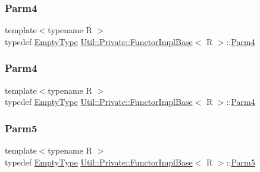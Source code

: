 \mbox{\label{structUtil_1_1Private_1_1FunctorImplBase_a1ad7fe3f243480c44a610927ebe76762}} 
\subsubsection{\texorpdfstring{Parm4}{Parm4}\hspace{0.1cm}{\footnotesize\ttfamily [2/3]}}
{\footnotesize\ttfamily template$<$typename R $>$ \\
typedef \mbox{\hyperlink{classUtil_1_1EmptyType}{Empty\+Type}} \mbox{\hyperlink{structUtil_1_1Private_1_1FunctorImplBase}{Util\+::\+Private\+::\+Functor\+Impl\+Base}}$<$ R $>$\+::\mbox{\hyperlink{structUtil_1_1Private_1_1FunctorImplBase_a1ad7fe3f243480c44a610927ebe76762}{Parm4}}}

\mbox{\label{structUtil_1_1Private_1_1FunctorImplBase_a1ad7fe3f243480c44a610927ebe76762}} 
\subsubsection{\texorpdfstring{Parm4}{Parm4}\hspace{0.1cm}{\footnotesize\ttfamily [3/3]}}
{\footnotesize\ttfamily template$<$typename R $>$ \\
typedef \mbox{\hyperlink{classUtil_1_1EmptyType}{Empty\+Type}} \mbox{\hyperlink{structUtil_1_1Private_1_1FunctorImplBase}{Util\+::\+Private\+::\+Functor\+Impl\+Base}}$<$ R $>$\+::\mbox{\hyperlink{structUtil_1_1Private_1_1FunctorImplBase_a1ad7fe3f243480c44a610927ebe76762}{Parm4}}}

\mbox{\label{structUtil_1_1Private_1_1FunctorImplBase_ac5b1d132e854e4f9fd6fb1e43313fa26}} 
\subsubsection{\texorpdfstring{Parm5}{Parm5}\hspace{0.1cm}{\footnotesize\ttfamily [1/3]}}
{\footnotesize\ttfamily template$<$typename R $>$ \\
typedef \mbox{\hyperlink{classUtil_1_1EmptyType}{Empty\+Type}} \mbox{\hyperlink{structUtil_1_1Private_1_1FunctorImplBase}{Util\+::\+Private\+::\+Functor\+Impl\+Base}}$<$ R $>$\+::\mbox{\hyperlink{structUtil_1_1Private_1_1FunctorImplBase_ac5b1d132e854e4f9fd6fb1e43313fa26}{Parm5}}}

